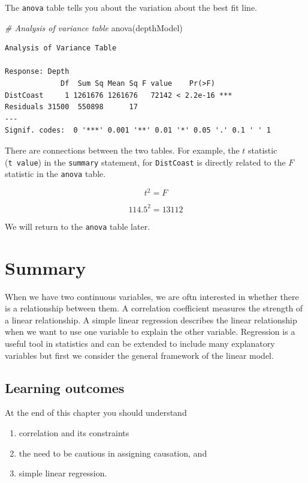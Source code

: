 \documentclass[
  oneside]{krantz}
\newenvironment{Shaded}{\begin{snugshade}}{\end{snugshade}}
\newcommand{\CommentTok}[1]{\textcolor[rgb]{0.56,0.35,0.01}{\textit{#1}}}
\newcommand{\FunctionTok}[1]{\textcolor[rgb]{0.00,0.00,0.00}{#1}}
\newcommand{\NormalTok}[1]{#1}
\providecommand{\tightlist}{%
  \setlength{\itemsep}{0pt}\setlength{\parskip}{0pt}}
\begin{document}
The \texttt{anova} table tells you about the variation about the best fit line.

\begin{Shaded}
\begin{Highlighting}[]
\CommentTok{\# Analysis of variance table}
\FunctionTok{anova}\NormalTok{(depthModel)}
\end{Highlighting}
\end{Shaded}

\begin{verbatim}
Analysis of Variance Table

Response: Depth
             Df  Sum Sq Mean Sq F value    Pr(>F)    
DistCoast     1 1261676 1261676   72142 < 2.2e-16 ***
Residuals 31500  550898      17                      
---
Signif. codes:  0 '***' 0.001 '**' 0.01 '*' 0.05 '.' 0.1 ' ' 1
\end{verbatim}

There are connections between the two tables. For example, the \(t\) statistic (\texttt{t\ value}) in the \texttt{summary} statement, for \texttt{DistCoast} is directly related to the \(F\) statistic in the \texttt{anova} table.

\[t^2 = F\]

\[114.5^2 = 13112\]

We will return to the \texttt{anova} table later.

\hypertarget{SUMcorreg}{%
\section{Summary}\label{SUMcorreg}}

When we have two continuous variables, we are oftn interested in whether there is a relationship between them. A correlation coefficient measures the strength of a linear relationship. A simple linear regression describes the linear relationship when we want to use one variable to explain the other variable. Regression is a useful tool in statistics and can be extended to include many explanatory variables but first we consider the general framework of the linear model.

\hypertarget{learning-outcomes-8}{%
\subsection{Learning outcomes}\label{learning-outcomes-8}}

At the end of this chapter you should understand

\begin{enumerate}
\def\labelenumi{\arabic{enumi}.}
\tightlist
\item
  correlation and its constraints
\item
  the need to be cautious in assigning causation, and
\item
  simple linear regression.
\end{enumerate}
\end{document}
